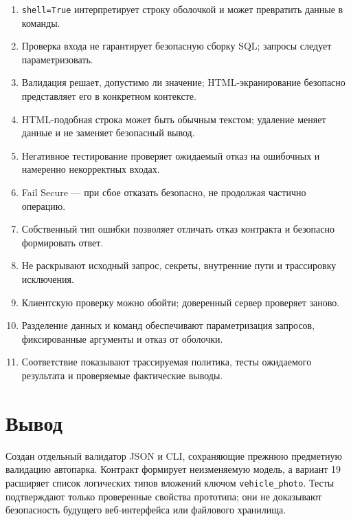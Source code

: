 \documentclass[12pt,a4paper]{article}
\begin{document}
\begin{enumerate}
\item \texttt{shell=True} интерпретирует строку оболочкой и может превратить данные в команды.
\item Проверка входа не гарантирует безопасную сборку SQL; запросы следует параметризовать.
\item Валидация решает, допустимо ли значение; HTML-экранирование безопасно представляет его в конкретном контексте.
\item HTML-подобная строка может быть обычным текстом; удаление меняет данные и не заменяет безопасный вывод.
\item Негативное тестирование проверяет ожидаемый отказ на ошибочных и намеренно некорректных входах.
\item Fail Secure — при сбое отказать безопасно, не продолжая частично операцию.
\item Собственный тип ошибки позволяет отличать отказ контракта и безопасно формировать ответ.
\item Не раскрывают исходный запрос, секреты, внутренние пути и трассировку исключения.
\item Клиентскую проверку можно обойти; доверенный сервер проверяет заново.
\item Разделение данных и команд обеспечивают параметризация запросов, фиксированные аргументы и отказ от оболочки.
\item Соответствие показывают трассируемая политика, тесты ожидаемого результата и проверяемые фактические выводы.
\end{enumerate}

\section{Вывод}
Создан отдельный валидатор JSON и CLI, сохраняющие прежнюю предметную валидацию автопарка. Контракт формирует неизменяемую модель, а вариант 19 расширяет список логических типов вложений ключом \texttt{vehicle\_photo}. Тесты подтверждают только проверенные свойства прототипа; они не доказывают безопасность будущего веб-интерфейса или файлового хранилища.
\end{document}
